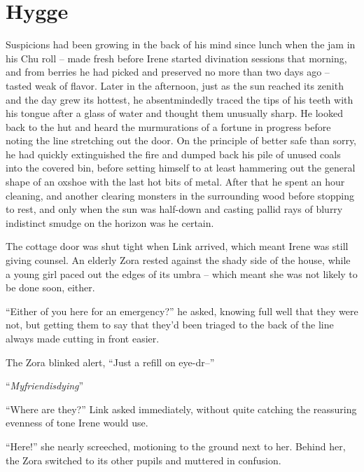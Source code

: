 \documentclass[../../FGP.tex]{subfiles}
\begin{document}
\section{Hygge}
Suspicions had been growing in the back of his mind since lunch when the jam in his Chu roll -- made fresh before Irene started divination sessions that morning, and from berries he had picked and preserved no more than two days ago -- tasted weak of flavor. Later in the afternoon, just as the sun reached its zenith and the day grew its hottest, he absentmindedly traced the tips of his teeth with his tongue after a glass of water and thought them unusually sharp. He looked back to the hut and heard the murmurations of a fortune in progress before noting the line stretching out the door. On the principle of better safe than sorry, he had quickly extinguished the fire and dumped back his pile of unused coals into the covered bin, before setting himself to at least hammering out the general shape of an oxshoe with the last hot bits of metal. After that he spent an hour cleaning, and another clearing monsters in the surrounding wood before stopping to rest, and only when the sun was half-down and casting pallid rays of blurry indistinct smudge on the horizon was he certain.

The cottage door was shut tight when Link arrived, which meant Irene was still giving counsel. An elderly Zora rested against the shady side of the house, while a young girl paced out the edges of its umbra -- which meant she was not likely to be done soon, either.

``Either of you here for an emergency?'' he asked, knowing full well that they were not, but getting them to say that they'd been triaged to the back of the line always made cutting in front easier.

The Zora blinked alert, ``Just a refill on eye-dr--''  

``\emph{Myfriendisdying}'' 

``Where are they?'' Link asked immediately, without quite catching the reassuring evenness of tone Irene would use.  %

``Here!'' she nearly screeched, motioning to the ground next to her. Behind her, the Zora  switched to its other pupils and muttered in confusion.
\end{document}
